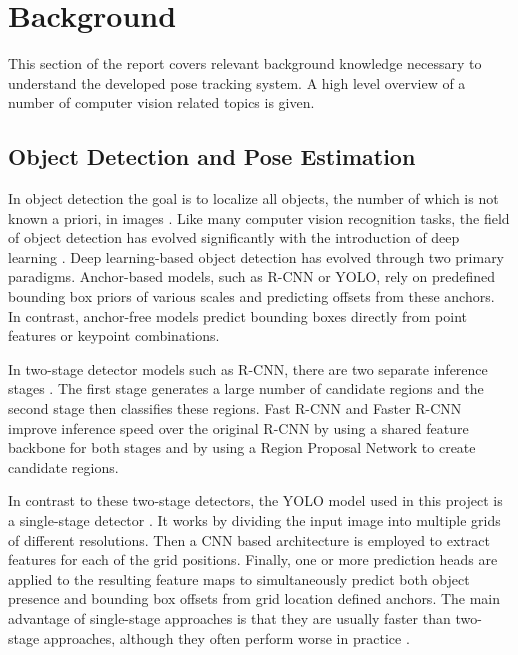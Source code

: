 
\section{Background} \label{background}

This section of the report covers relevant background knowledge necessary to understand the developed pose tracking system. A high level overview of a number of computer vision related topics is given.


\subsection{Object Detection and Pose Estimation} \label{detection}

In object detection the goal is to localize all objects, the number of which is not known a priori, in images \parencite{Lanz2026Notes}. Like many computer vision recognition tasks, the field of object detection has evolved significantly with the introduction of deep learning \parencite{Lanz2026Notes}. Deep learning-based object detection has evolved through two primary paradigms. Anchor-based models, such as R-CNN or YOLO, rely on predefined bounding box priors of various scales and predicting offsets from these anchors. In contrast, anchor-free models predict bounding boxes directly from point features or keypoint combinations.

In two-stage detector models such as R-CNN, there are two separate inference stages \parencite{bharati2019deep}. The first stage generates a large number of candidate regions and the second stage then classifies these regions. Fast R-CNN \parencite{girshick2015fast} and Faster R-CNN \parencite{ren2015faster} improve inference speed over the original R-CNN by using a shared feature backbone for both stages and by using a Region Proposal Network to create candidate regions.

In contrast to these two-stage detectors, the YOLO model used in this project is a single-stage detector \parencite{jiang2022review}. It works by dividing the input image into multiple grids of different resolutions. Then a CNN based architecture is employed to extract features for each of the grid positions. Finally, one or more prediction heads are applied to the resulting feature maps to simultaneously predict both object presence and bounding box offsets from grid location defined anchors. The main advantage of single-stage approaches is that they are usually faster than two-stage approaches, although they often perform worse in practice \parencite{Lanz2026Notes}.

